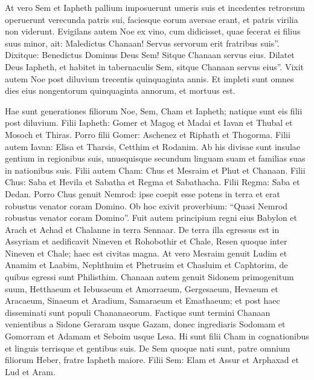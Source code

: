 \begin{biblechapter}
\begin{biblechapter}
\begin{biblechapter}
\begin{biblechapter}
\begin{biblechapter}
\begin{biblechapter}
\begin{biblechapter}
\begin{biblechapter}
\begin{biblechapter}
\verse At vero Sem et Iapheth pallium imposuerunt umeris suis et incedentes retrorsum operuerunt verecunda patris sui, faciesque eorum aversae erant, et patris virilia non viderunt. 
\verse Evigilans autem Noe ex vino, cum didicisset, quae fecerat ei filius suus minor, 
\verse ait:
 Maledictus Chanaan!
 Servus servorum erit fratribus suis”.
 \verse Dixitque:
 Benedictus Dominus Deus Sem!
 Sitque Chanaan servus eius.
 \verse Dilatet Deus Iapheth,
 et habitet in tabernaculis Sem,
 sitque Chanaan servus eius”.
 \verse Vixit autem Noe post diluvium trecentis quinquaginta annis. 
\verse Et impleti sunt omnes dies eius nongentorum quinquaginta annorum, et mortuus est.
 
\begin{biblechapter}
\verse Hae sunt generationes filiorum Noe, Sem, Cham et Iapheth; natique sunt eis filii post diluvium.
\verse Filii Iapheth: Gomer et Magog et Madai et Iavan et Thubal et Mosoch et Thiras. 
\verse Porro filii Gomer: Aschenez et Riphath et Thogorma. 
\verse Filii autem Iavan: Elisa et Tharsis, Cetthim et Rodanim. 
\verse Ab his divisae sunt insulae gentium in regionibus suis, unusquisque secundum linguam suam et familias suas in nationibus suis.
 \verse Filii autem Cham: Chus et Mesraim et Phut et Chanaan. 
\verse Filii Chus: Saba et Hevila et Sabatha et Regma et Sabathacha. Filii Regma: Saba et Dedan. 
\verse Porro Chus genuit Nemrod: ipse coepit esse potens in terra 
\verse et erat robustus venator coram Domino. Ob hoc exivit proverbium: “Quasi Nemrod robustus venator coram Domino”. 
\verse Fuit autem principium regni eius Babylon et Arach et Achad et Chalanne in terra Sennaar. 
\verse De terra illa egressus est in Assyriam et aedificavit Nineven et Rohobothir et Chale, 
\verse Resen quoque inter Nineven et Chale; haec est civitas magna. 
\verse At vero Mesraim genuit Ludim et Anamim et Laabim, Nephthuim 
\verse et Phetrusim et Chasluim et Caphtorim, de quibus egressi sunt Philisthim. 
\verse Chanaan autem genuit Sidonem primogenitum suum, Hetthaeum 
\verse et Iebusaeum et Amorraeum, Gergesaeum, 
\verse Hevaeum et Aracaeum, Sinaeum 
\verse et Aradium, Samaraeum et Emathaeum; et post haec disseminati sunt populi Chananaeorum. 
\verse Factique sunt termini Chanaan venientibus a Sidone Geraram usque Gazam, donec ingrediaris Sodomam et Gomorram et Adamam et Seboim usque Lesa. 
\verse Hi sunt filii Cham in cognationibus et linguis terrisque et gentibus suis.
 \verse De Sem quoque nati sunt, patre omnium filiorum Heber, fratre Iapheth maiore. 
 \verse Filii Sem: Elam et Assur et Arphaxad et Lud et Aram. 

\end{biblechapter}
\end{biblechapter}
\end{biblechapter}
\end{biblechapter}
\end{biblechapter}
\end{biblechapter}
\end{biblechapter}
\end{biblechapter}
\end{biblechapter}
\end{biblechapter}
